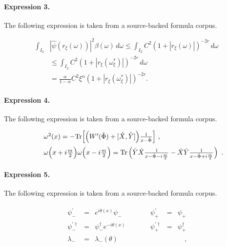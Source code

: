\documentclass[11pt]{article}
\begin{document}
\paragraph{Expression 3.} The following expression is taken from a source-backed formula corpus.

\begin{align*}\int_{I_2} & |\hat{\psi}(r_{\xi}(\omega)) |^2 \beta(\omega)\, d\omega \leq \int_{I_2} C^2 (1 + | r_{\xi}(\omega) |)^{-2r} \, d\omega \\& \leq \int_{I_2} C^2 (1 + | r_{\xi}(\omega_{\xi}^{\ast}) |)^{-2r}\, d\omega \\& = \frac{\alpha}{1 - \alpha} C^2 \xi^{\alpha} (1 + | r_{\xi}(\omega_{\xi}^{\ast}) |)^{-2r}.\end{align*}

\paragraph{Expression 4.} The following expression is taken from a source-backed formula corpus.

\begin{align*}\begin{array}{ccl}\vspace{.2cm}&& \omega^2(x)= - {\rm Tr}\Big[\Big(W'(\hat \Phi)+[\hat X,\hat Y]\Big)\frac1{x-\hat\Phi}\Big] \ ,\\ && \omega\Big(x+i\frac m2\Big)\omega\Big(x-i\frac m2\Big)={\rm Tr}\left(\hat Y\hat X\frac1{x-\hat\Phi-i\frac m2}-\hat X\hat Y\frac1{x-\hat\Phi+i\frac m2}\right)\ . \end{array}\end{align*}

\paragraph{Expression 5.} The following expression is taken from a source-backed formula corpus.

\begin{align*}\begin{array}{rclcrcl} \psi^{\prime}_{-} & = & e^{i\theta (x)}\psi_{-} &\quad \quad& \psi^{\prime}_{+} & = & \psi_{+} \\ \psi^{\prime \dag }_{-} & = & \psi^{\dag}_{-} e^{- i \theta (x) } &\quad\quad &\psi^{\prime \dag}_{+} & = & \psi^{\dag}_{+} \\ \lambda_{-} &=& \lambda_{-}(\theta) &&&&\quad, \end{array}\end{align*}
\end{document}
